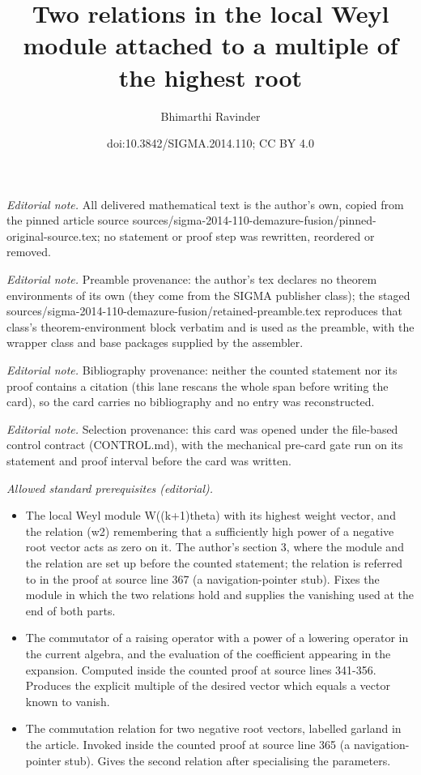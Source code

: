 \documentclass[10pt,a4paper]{amsart}
\title{Two relations in the local Weyl module attached to a multiple of the highest root}
\author{Bhimarthi Ravinder}
\date{doi:10.3842/SIGMA.2014.110; CC BY 4.0}
\begin{document}
\maketitle
\noindent\textit{Editorial note.} All delivered mathematical text is the author's own, copied from the pinned article source sources/sigma-2014-110-demazure-fusion/pinned-original-source.tex; no statement or proof step was rewritten, reordered or removed.\par\medskip
\noindent\textit{Editorial note.} Preamble provenance: the author's tex declares no theorem environments of its own (they come from the SIGMA publisher class); the staged sources/sigma-2014-110-demazure-fusion/retained-preamble.tex reproduces that class's theorem-environment block verbatim and is used as the preamble, with the wrapper class and base packages supplied by the assembler.\par\medskip
\noindent\textit{Editorial note.} Bibliography provenance: neither the counted statement nor its proof contains a citation (this lane rescans the whole span before writing the card), so the card carries no bibliography and no entry was reconstructed.\par\medskip
\noindent\textit{Editorial note.} Selection provenance: this card was opened under the file-based control contract (CONTROL.md), with the mechanical pre-card gate run on its statement and proof interval before the card was written.\par\medskip
\noindent\textit{Allowed standard prerequisites (editorial).}\begin{itemize}
\item The local Weyl module W((k+1)theta) with its highest weight vector, and the relation (w2) remembering that a sufficiently high power of a negative root vector acts as zero on it. The author's section 3, where the module and the relation are set up before the counted statement; the relation is referred to in the proof at source line 367 (a navigation-pointer stub). Fixes the module in which the two relations hold and supplies the vanishing used at the end of both parts.
\item The commutator of a raising operator with a power of a lowering operator in the current algebra, and the evaluation of the coefficient appearing in the expansion. Computed inside the counted proof at source lines 341-356. Produces the explicit multiple of the desired vector which equals a vector known to vanish.
\item The commutation relation for two negative root vectors, labelled garland in the article. Invoked inside the counted proof at source line 365 (a navigation-pointer stub). Gives the second relation after specialising the parameters.
\end{itemize}\medskip
\end{document}
